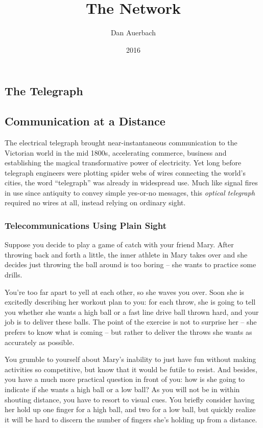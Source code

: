 \documentclass[UTF8]{book}
\begin{document}
\begin{CJK}{UTF8}{gbsn}

\title{The Network}
\author{Dan Auerbach}
\date{2016}
\maketitle


\part{The Telegraph}

\chapter{Communication at a Distance}

The electrical telegraph brought near-instantaneous communication to the Victorian world in the mid 1800s, accelerating commerce, business and establishing the magical transformative power of electricity. Yet long before telegraph engineers were plotting spider webs of wires connecting the world's cities, the word ``telegraph'' was already in widespread use. Much like signal fires in use since antiquity to convey simple yes-or-no messages, this \emph{optical telegraph} required no wires at all, instead relying on ordinary sight.

\section{Telecommunications Using Plain Sight}

Suppose you decide to play a game of catch with your friend Mary. After throwing back and forth a little, the inner athlete in Mary takes over and she decides just throwing the ball around is too boring -- she wants to practice some drills.

You're too far apart to yell at each other, so she waves you over. Soon she is excitedly describing her workout plan to you: for each throw, she is going to tell you whether she wants a high ball or a fast line drive ball thrown hard, and your job is to deliver these balls. The point of the exercise is not to surprise her -- she prefers to know what is coming -- but rather to deliver the throws she wants as accurately as possible.

You grumble to yourself about Mary's inability to just have fun without making activities so competitive, but know that it would be futile to resist. And besides, you have a much more practical question in front of you: how is she going to indicate if she wants a high ball or a low ball? As you will not be in within shouting distance, you have to resort to visual cues. You briefly consider having her hold up one finger for a high ball, and two for a low ball, but quickly realize it will be hard to discern the number of fingers she's holding up from a distance.


\end{CJK}
\end{document}
